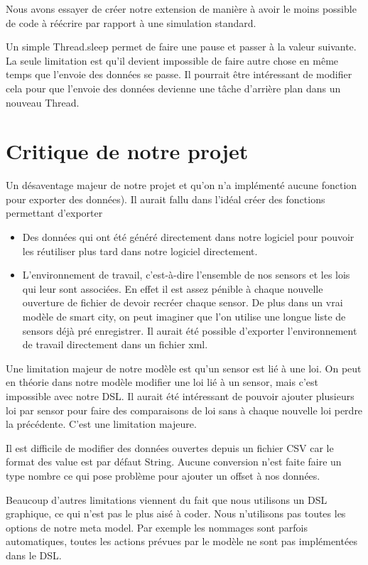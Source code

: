 \documentclass[11pt]{article}
\begin{document}
Nous avons essayer de créer notre extension de manière à avoir le moins possible de code à réécrire par rapport à une simulation standard.

Un simple Thread.sleep permet de faire une pause et passer à la valeur suivante. La seule limitation est qu'il devient impossible de faire autre chose en même temps que l'envoie des données se passe. Il pourrait être intéressant de modifier cela pour que l'envoie des données devienne une tâche d'arrière plan dans un nouveau Thread.


\section{Critique de notre projet}

Un désaventage majeur de notre projet et qu'on n'a implémenté aucune fonction pour exporter des données). Il aurait fallu dans l'idéal créer des fonctions permettant d'exporter
\begin{itemize}
\item Des données qui ont été généré directement dans notre logiciel pour pouvoir les réutiliser plus tard dans notre logiciel directement.
\item L'environnement de travail, c'est-à-dire l'ensemble de nos sensors et les lois qui leur sont associées. En effet il est assez pénible à chaque nouvelle ouverture de fichier de devoir recréer chaque sensor. De plus dans un vrai modèle de smart city, on peut imaginer que l'on utilise une longue liste de sensors déjà pré enregistrer. Il aurait été possible d'exporter l'environnement de travail directement dans un fichier xml.
\end{itemize}

Une limitation majeur de notre modèle est qu'un sensor est lié à une loi. On peut en théorie dans notre modèle modifier une loi lié à un sensor, mais c'est impossible avec notre DSL. Il aurait été intéressant de pouvoir ajouter plusieurs loi par sensor pour faire des comparaisons de loi sans à chaque nouvelle loi perdre la précédente. C'est une limitation majeure. 

Il est difficile de modifier des données ouvertes depuis un fichier CSV car le format des value est par défaut String. Aucune conversion n'est faite faire un type nombre ce qui pose problème pour ajouter un offset à nos données.

Beaucoup d'autres limitations viennent du fait que nous utilisons un DSL graphique, ce qui n'est pas le plus aisé à coder. Nous n'utilisons pas toutes les options de notre meta model. Par exemple les nommages sont parfois automatiques, toutes les actions prévues par le modèle ne sont pas implémentées dans le DSL.
\end{document}
